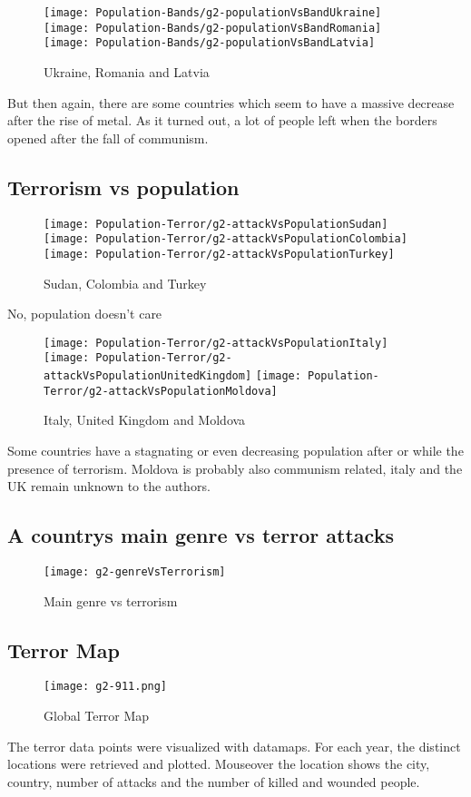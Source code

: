 \begin{figure}[hbt!]
	\texttt{[image: Population-Bands/g2-populationVsBandUkraine]}
	\centering
	\texttt{[image: Population-Bands/g2-populationVsBandRomania]}
	\texttt{[image: Population-Bands/g2-populationVsBandLatvia]}
	\caption{Ukraine, Romania and Latvia}
\end{figure}
But then again, there are some countries which seem to have a massive decrease after the rise of metal. As it turned out, a lot of people left when the borders opened after the fall of communism.



\subsection{Terrorism vs population}
\begin{figure}[hbt!]
	\texttt{[image: Population-Terror/g2-attackVsPopulationSudan]}
	\centering
	\texttt{[image: Population-Terror/g2-attackVsPopulationColombia]}
	\texttt{[image: Population-Terror/g2-attackVsPopulationTurkey]}
	\caption{Sudan, Colombia and Turkey}
\end{figure}
No, population doesn't care

\begin{figure}[hbt!]
	\texttt{[image: Population-Terror/g2-attackVsPopulationItaly]}
	\centering
	\texttt{[image: Population-Terror/g2-attackVsPopulationUnitedKingdom]}
	\texttt{[image: Population-Terror/g2-attackVsPopulationMoldova]}
	\caption{Italy, United Kingdom and Moldova}
\end{figure}
Some countries have a stagnating or even decreasing population after or while the presence of terrorism. Moldova is probably also communism related, italy and the UK remain unknown to the authors.


\subsection{A countrys main genre vs terror attacks}
\begin{figure}[hbt!]
	\centering
	\texttt{[image: g2-genreVsTerrorism]}
	\caption{Main genre vs terrorism}
\end{figure}



\subsection{Terror Map}
\begin{figure}[hbt!]
	\centering
	\texttt{[image: g2-911.png]}
	\caption{Global Terror Map}
\end{figure}
The terror data points were visualized with datamaps. For each year, the distinct locations were retrieved and plotted. Mouseover the location shows the city, country, number of attacks and the number of killed and wounded people.